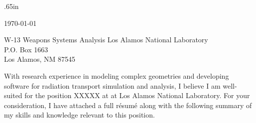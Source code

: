 \documentclass[a4paper,10pt]{article}
\begin{document}
\pagestyle{empty} 		%
\sloppy 			%


\vspace{5mm}


  \normalsize
  
  \begingroup
  \leftskip.65in
  \rightskip\leftskip

  \vspace{4mm} 
  \today \\
  \vspace{2mm}

W-13 Weapons Systems Analysis
Los Alamos National Laboratory \\
P.O. Box 1663 \\
Los Alamos, NM 87545
  
  \vspace{4mm} 

With research experience in modeling complex geometries and developing
software for radiation transport simulation and analysis, I believe I am
well-suited for the position XXXXX at at Los Alamos National Laboratory.
For your consideration, I have attached a full r\'{e}sum\'{e} along with
the following summary of my skills and
knowledge relevant to this position.


\end{document}
